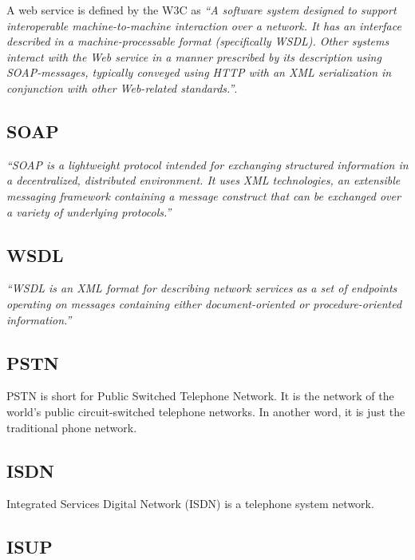 A web service is defined by the W3C as \textit{``A software system designed to support interoperable machine-to-machine interaction over a network. It has an interface described in a machine-processable format (specifically WSDL). Other systems interact with the Web service in a manner prescribed by its description using SOAP-messages, typically conveyed using HTTP with an XML serialization in conjunction with other Web-related standards.''}. \cite{WebServicesW3C}

\subsection*{SOAP}
\label{sec:SOAP}
\label{sym:SOAP}

\textit{``SOAP is a lightweight protocol intended for exchanging structured information in a decentralized, distributed environment. It uses XML technologies, an extensible messaging framework containing a message construct that can be exchanged over a variety of underlying protocols.''} \cite{SOAPVersion1dot2}

\subsection*{WSDL}
\label{sec:WSDL}
\label{sym:WSDL}

\textit{``WSDL is an XML format for describing network services as a set of endpoints operating on messages containing either document-oriented or procedure-oriented information.''} \cite{WSDL1dot1} 

\subsection*{PSTN}
\label{sym:PSTN} 
\label{sec:PSTN}

PSTN is short for Public Switched Telephone Network. It is the network of the world's public circuit-switched telephone networks. In another word, it is just the traditional phone network.

\subsection*{ISDN}
\label{sym:ISDN} 
\label{sec:ISDN}

Integrated Services Digital Network (ISDN) is a telephone system network.

\subsection*{ISUP}
\label{sym:ISUP} 
\label{sec:ISUP}

